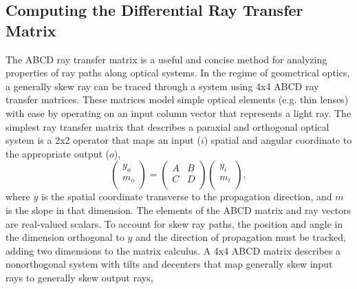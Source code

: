 \subsection{Computing the Differential Ray Transfer Matrix}
The ABCD ray transfer matrix is a useful and concise method for analyzing properties of ray paths along optical systems. In the regime of geometrical optics, a generally skew ray can be traced through a system using 4x4 ABCD ray transfer matrices\cite{Brouwer64}. These matrices model simple optical elements (e.g. thin lenses) with ease by operating on an input column vector that represents a light ray. The simplest ray transfer matrix that describes a paraxial and orthogonal optical system is a 2x2 operator that maps an input ($i$) spatial and angular coordinate to the appropriate output ($o$),
\begin{equation}
    \begin{pmatrix}
    y_o \\
    m_o \\
    \end{pmatrix}
    =
    \begin{pmatrix}
    A & B \\
    C & D \\
    \end{pmatrix}
    \begin{pmatrix}
    y_i \\
    m_i \\
    \end{pmatrix},
\end{equation}
where $y$ is the spatial coordinate transverse to the propagation direction, and $m$ is the slope in that dimension. The elements of the ABCD matrix and ray vectors are real-valued scalars. To account for skew ray paths, the position and angle in the dimension orthogonal to $y$ and the direction of propagation must be tracked, adding two dimensions to the matrix calculus. A 4x4 ABCD matrix describes a nonorthogonal system with tilts and decenters that map generally skew input rays to generally skew output rays, 

